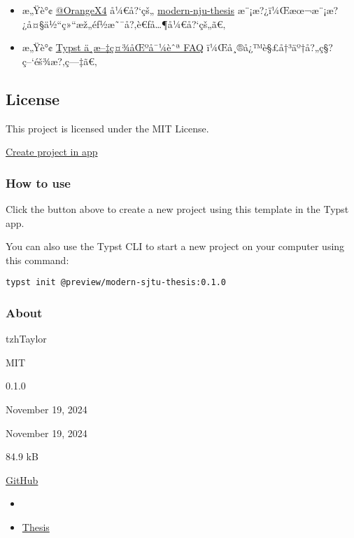 \begin{itemize}
\item
  æ„Ÿè°¢ \href{https://github.com/OrangeX4}{@OrangeX4} å¼€å?{}`çš„
  \href{https://github.com/nju-lug/modern-nju-thesis}{modern-nju-thesis}
  æ¨¡æ?¿ï¼Œæœ¬æ¨¡æ?¿å¤§ä½``ç»``æž„éƒ½æ˜¯å?‚è€ƒå\ldots¶å¼€å?{}`çš„ã€‚
\item
  æ„Ÿè°¢ \href{https://typst-doc-cn.github.io/guide/FAQ.html}{Typst
  ä¸­æ--‡ç¤¾åŒºå¯¼èˆª FAQ} ï¼Œå¸®å¿™è§£å†³äº†å?„ç§?ç--`éš¾æ?‚ç---‡ã€‚
\end{itemize}

\subsection{License}\label{license}

This project is licensed under the MIT License.

\href{/app?template=modern-sjtu-thesis&version=0.1.0}{Create project in
app}

\subsubsection{How to use}\label{how-to-use}

Click the button above to create a new project using this template in
the Typst app.

You can also use the Typst CLI to start a new project on your computer
using this command:

\begin{verbatim}
typst init @preview/modern-sjtu-thesis:0.1.0
\end{verbatim}



\subsubsection{About}\label{about}

\begin{description}
\tightlist
\item[Author :]
tzhTaylor
\item[License:]
MIT
\item[Current version:]
0.1.0
\item[Last updated:]
November 19, 2024
\item[First released:]
November 19, 2024
\item[Archive size:]
84.9 kB
\href{https://packages.typst.org/preview/modern-sjtu-thesis-0.1.0.tar.gz}{\pandocbounded{}}
\item[Repository:]
\href{https://github.com/tzhTaylor/typst-sjtu-thesis-master}{GitHub}
\item[Categor y :]
\begin{itemize}
\tightlist
\item[]
\item
  \pandocbounded{}
  \href{https://typst.app/universe/search/?category=thesis}{Thesis}
\end{itemize}
\end{description}

